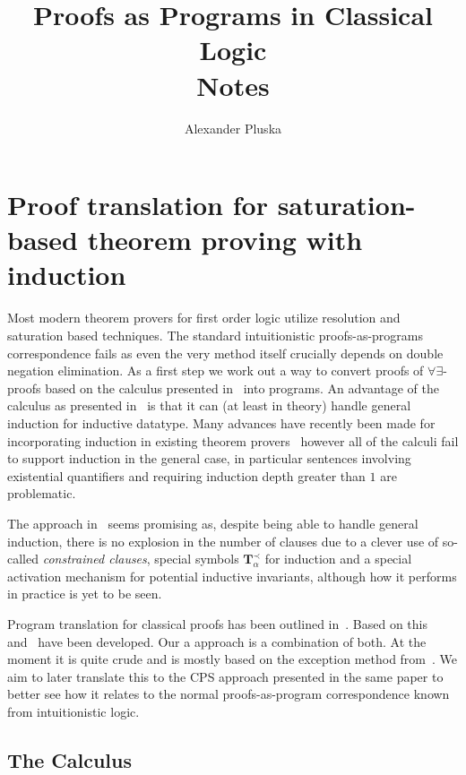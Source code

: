 \documentclass[onehalfspacing]{article}
\author{Alexander Pluska}
\title{Proofs as Programs in Classical Logic\\Notes}
\begin{document}
\maketitle

\section{Proof translation for saturation-based theorem proving with induction}

Most modern theorem provers for first order logic utilize resolution and saturation based techniques. The standard intuitionistic proofs-as-programs correspondence fails as even the very method itself crucially depends on double negation elimination. As a first step we work out a way to convert proofs of $\forall\exists$-proofs based on the calculus presented in~\cite{Echenim_2019} into programs. An advantage of the calculus as presented in~\cite{Echenim_2019} is that it can (at least in theory) handle general induction for inductive datatype. Many advances have recently been made for incorporating induction in existing theorem provers~\cite{hajdu2021automating}\cite{10.1007/978-3-030-53518-6_8} however all of the calculi fail to support induction in the general case, in particular sentences involving existential quantifiers and requiring induction depth greater than $1$ are problematic.

The approach in~\cite{Echenim_2019} seems promising as, despite being able to handle general induction, there is no explosion in the number of clauses due to a clever use of so-called \textit{constrained clauses}, special symbols $\textbf{T}_\alpha^\prec$ for induction and a special activation mechanism for potential inductive invariants, although how it performs in practice is yet to be seen.

Program translation for classical proofs has been outlined in~\cite{Griffin_1990}. Based on this~\cite{de_Groote_1995} and~\cite{Barbanera_1996} have been developed. Our a approach is a combination of both. At the moment it is quite crude and is mostly based on the exception method from~\cite{de_Groote_1995}. We aim to later translate this to the CPS approach presented in the same paper to better see how it relates to the normal proofs-as-program correspondence known from intuitionistic logic.



\subsection{The Calculus}
\end{document}
